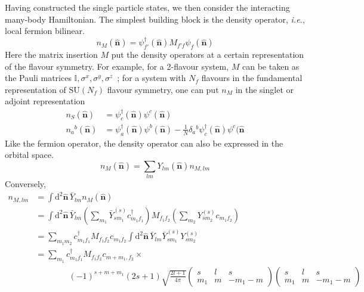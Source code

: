 \documentclass{timesjhep}
\begin{document}
Having constructed the single particle states, we then consider the interacting many-body Hamiltonian. The simplest building block is the density operator, \textit{i.e.}, local fermion bilinear. 
\begin{equation}
    n_M(\hat{\mathbf{n}})=\psi_{f'}^\dagger(\hat{\mathbf{n}})M_{f'f}\psi_f(\hat{\mathbf{n}})
    \label{eq:den_def}
\end{equation}
Here the matrix insertion $M$ put the density operators at a certain representation of the flavour symmetry. For example, for a 2-flavour system, $M$ can be taken as the Pauli matrices $\mathbb{I},\sigma^x,\sigma^y,\sigma^z$~; for a system with $N_f$ flavours in the fundamental representation of $\mathrm{SU}(N_f)$ flavour symmetry, one can put $n_M$ in the singlet or adjoint representation 
\begin{align}
    n_S(\hat{\mathbf{n}})&=\psi_{c}^\dagger(\hat{\mathbf{n}})\psi^c(\hat{\mathbf{n}})\nonumber\\ 
    n_a{}^b(\hat{\mathbf{n}})&=\psi_{a}^\dagger(\hat{\mathbf{n}})\psi^b(\hat{\mathbf{n}})-\tfrac{1}{N}\delta_{a}{}^b\psi_c^\dagger(\hat{\mathbf{n}})\psi^c(\hat{\mathbf{n}}
\end{align} 
Like the fermion operator, the density operator can also be expressed in the orbital space. 
\begin{equation}
    n_M(\hat{\mathbf{n}})=\sum_{lm}Y_{lm}(\hat{\mathbf{n}})n_{M,lm}
    \label{eq:den_decomp}
\end{equation}
Conversely, 
\begin{align}
    n_{M,lm}&=\int\mathrm{d}^2\hat{\mathbf{n}}\,\bar{Y}_{lm}n_M(\hat{\mathbf{n}})\nonumber\\
    &=\int\mathrm{d}^2\hat{\mathbf{n}}\,\bar{Y}_{lm}\left(\sum_{m_1}\bar{Y}^{(s)}_{sm_1}c^\dagger_{m_1f_1}\right)M_{f_1f_2}\left(\sum_{m_2}Y^{(s)}_{sm_2}c_{m_1f_2}\right)\nonumber\\
    &=\sum_{m_1m_2}c^\dagger_{m_1f_1}M_{f_1f_2}c_{m_1f_2}\int\mathrm{d}^2\hat{\mathbf{n}}\,\bar{Y}_{lm}\bar{Y}^{(s)}_{sm_1}Y^{(s)}_{sm_2}\nonumber\\
    &=\sum_{m_1}c^\dagger_{m_1f_1}M_{f_1f_2}c_{m+m_1,f_2}\times\nonumber\\
    &\qquad\qquad(-1)^{s+m+m_1}(2s+1)\sqrt{\frac{2l+1}{4\pi}}\begin{pmatrix}s&l&s\\m_1&m&-m_1-m\end{pmatrix}\begin{pmatrix}s&l&s\\m_1&m&-m_1-m\end{pmatrix}
    \label{eq:den_mod}
\end{align}
\end{document}
